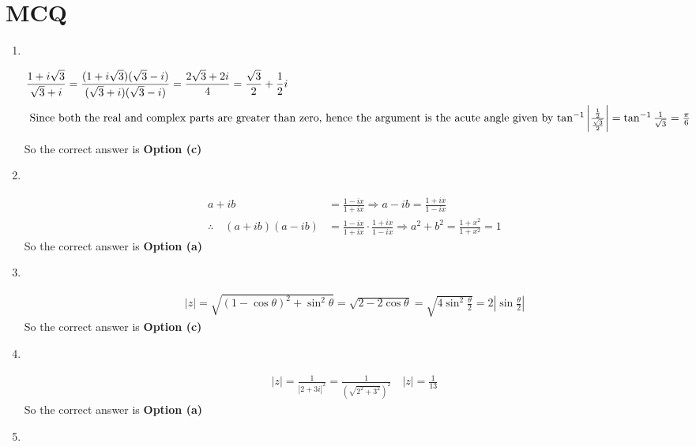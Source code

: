 \section{MCQ}
\begin{enumerate}
	\item $\left. \right. $
	\begin{answer}
		\begin{align*}
	\frac{1+i \sqrt{3}}{\sqrt{3}+i}&=\frac{(1+i \sqrt{3})(\sqrt{3}-i)}{(\sqrt{3}+i)(\sqrt{3}-i)}=\frac{2 \sqrt{3}+2 i}{4}=\frac{\sqrt{3}}{2}+\frac{1}{2} i\\
\intertext{	Since both the real and complex parts are greater than zero, hence the argument is the acute angle given by $\tan ^{-1}\left|\frac{\frac{1}{2}}{\frac{\sqrt{3}}{2}}\right|=\tan ^{-1} \frac{1}{\sqrt{3}}=\frac{\pi}{6}$}
		\end{align*}
		So the correct answer is \textbf{Option (c)}
	\end{answer}
\item $\left. \right. $	
	\begin{answer}
		\begin{align*}
		a+i b&=\frac{1-i x}{1+i x} \Rightarrow a-i b=\frac{1+i x}{1-i x}\\
		\therefore \quad(a+i b)(a-i b)&=\frac{1-i x}{1+i x} \cdot \frac{1+i x}{1-i x} \Rightarrow a^{2}+b^{2}=\frac{1+x^{2}}{1+x^{2}}=1
		\end{align*}
		So the correct answer is \textbf{Option (a)}
	\end{answer}
\item $\left. \right. $	
	\begin{answer}
		\begin{align*}
		|z|=\sqrt{(1-\cos \theta)^{2}+\sin ^{2} \theta}=\sqrt{2-2 \cos \theta}=\sqrt{4 \sin ^{2} \frac{\theta}{2}}=2\left|\sin \frac{\theta}{2}\right|
		\end{align*}
		So the correct answer is \textbf{Option (c)}
	\end{answer}
\item $\left. \right. $		
	\begin{answer}
		\begin{align*}
		|z|=\frac{1}{|2+3 i|^{2}}=\frac{1}{\left(\sqrt{2^{2}+3^{2}}\right)^{2}} \quad|z|=\frac{1}{13}
		\end{align*}
		So the correct answer is \textbf{Option (a)}
	\end{answer}
\item $\left. \right. $		
	\begin{answer}
		\begin{align*}

\end{align*}
\end{answer}
\end{enumerate}
